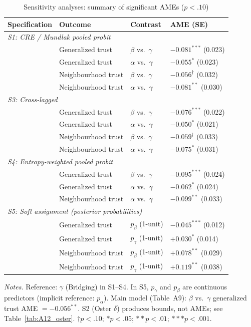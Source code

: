 \documentclass[12pt, a4paper]{article}
\newcommand{\tablenote}[1]{\vspace{4pt}\par\footnotesize\textit{Notes.} #1}
\begin{document}
\begin{table}[H]
\centering
\caption{Sensitivity analyses: summary of significant AMEs ($p < .10$)}
\label{tab:A11_comparison}
\small
\begin{tabular}{llll}
\hline\hline
  Specification & Outcome & Contrast & AME (SE) \\
\hline
  \multicolumn{4}{l}{\textit{S1: CRE / Mundlak pooled probit}} \\
  & Generalized trust    & $\beta$ vs.\ $\gamma$ & $-0.081^{***}$ (0.023) \\
  & Generalized trust    & $\alpha$ vs.\ $\gamma$ & $-0.055^{*}$ (0.023) \\
  & Neighbourhood trust  & $\beta$ vs.\ $\gamma$ & $-0.056^{\dagger}$ (0.032) \\
  & Neighbourhood trust  & $\alpha$ vs.\ $\gamma$ & $-0.081^{**}$ (0.030) \\
\hline
  \multicolumn{4}{l}{\textit{S3: Cross-lagged}} \\
  & Generalized trust    & $\beta$ vs.\ $\gamma$ & $-0.076^{***}$ (0.022) \\
  & Generalized trust    & $\alpha$ vs.\ $\gamma$ & $-0.050^{*}$ (0.021) \\
  & Neighbourhood trust  & $\beta$ vs.\ $\gamma$ & $-0.059^{\dagger}$ (0.033) \\
  & Neighbourhood trust  & $\alpha$ vs.\ $\gamma$ & $-0.075^{*}$ (0.031) \\
\hline
  \multicolumn{4}{l}{\textit{S4: Entropy-weighted pooled probit}} \\
  & Generalized trust    & $\beta$ vs.\ $\gamma$ & $-0.095^{***}$ (0.024) \\
  & Generalized trust    & $\alpha$ vs.\ $\gamma$ & $-0.062^{*}$ (0.024) \\
  & Neighbourhood trust  & $\alpha$ vs.\ $\gamma$ & $-0.099^{**}$ (0.033) \\
\hline
  \multicolumn{4}{l}{\textit{S5: Soft assignment (posterior probabilities)}} \\
  & Generalized trust    & $p_{\beta}$ (1-unit)  & $-0.045^{***}$ (0.012) \\
  & Generalized trust    & $p_{\gamma}$ (1-unit) & $+0.030^{*}$ (0.014) \\
  & Neighbourhood trust  & $p_{\beta}$ (1-unit)  & $+0.078^{**}$ (0.029) \\
  & Neighbourhood trust  & $p_{\gamma}$ (1-unit) & $+0.119^{**}$ (0.038) \\
\hline\hline
\end{tabular}
\tablenote{Reference: $\gamma$ (Bridging) in S1--S4. In S5, $p_{\gamma}$ and
$p_{\beta}$ are continuous predictors (implicit reference: $p_{\alpha}$).
Main model (Table~A9): $\beta$ vs.\ $\gamma$ generalized trust AME
$= -0.056^{**}$. S2 (Oster $\delta$) produces bounds, not AMEs; see
Table~\ref{tab:A12_oster}.
$\dagger p<.10$; $* p<.05$; $** p<.01$; $*** p<.001$.}
\end{table}
\end{document}
